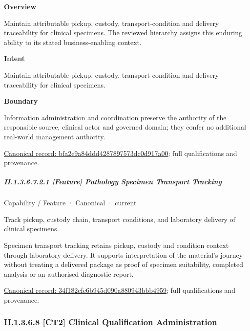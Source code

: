 \textbf{Overview}



Maintain attributable pickup, custody, transport-condition and delivery traceability for clinical specimens. The reviewed hierarchy assigns this enduring ability to its stated business-enabling context.



\textbf{Intent}



Maintain attributable pickup, custody, transport-condition and delivery traceability for clinical specimens.



\textbf{Boundary}



Information administration and coordination preserve the authority of the responsible source, clinical actor and governed domain; they confer no additional real-world management authority.


{\footnotesize \href{../../../../../../../continuum/strategy/capability/bfa2e9a84ddd4287897573dc0d917a00.md}{Canonical record: bfa2e9a84ddd4287897573dc0d917a00}; full qualifications and provenance.}\par
\subparagraph*{II.1.3.6.7.2.1 [Feature] Pathology Specimen Transport Tracking}
\label{navigation:II.1.3.6.7.2.1}

\label{element:34f182cfc6b945d090a880943bbb4959}
{\small Capability / Feature · Canonical · current}\par

Track pickup, custody chain, transport conditions, and laboratory delivery of clinical specimens.



Specimen transport tracking retains pickup, custody and condition context through laboratory delivery. It supports interpretation of the material's journey without treating a delivered package as proof of specimen suitability, completed analysis or an authorised diagnostic report.


{\footnotesize \href{../../../../../../../continuum/strategy/capability/feature/34f182cfc6b945d090a880943bbb4959.md}{Canonical record: 34f182cfc6b945d090a880943bbb4959}; full qualifications and provenance.}\par
\subsubsection*{II.1.3.6.8 [CT2] Clinical Qualification Administration}
\label{navigation:II.1.3.6.8}

